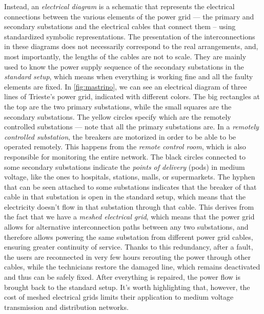 Instead, an \emph{electrical diagram} is a schematic that represents the electrical connections between the various elements of the power grid --- the primary and secondary substations and the electrical cables that connect them -- using standardized symbolic representations. The presentation of the interconnections in these diagrams does not necessarily correspond to the real arrangements, and, most importantly, the lengths of the cables are not to scale. They are mainly used to know the power supply sequence of the secondary substations in the \emph{standard setup}, which means when everything is working fine and all the faulty elements are fixed. In \autoref{fig:mastrino}, we can see an electrical diagram of three lines of Trieste's power grid, indicated with different colors. The big rectangles at the top are the two primary substations, while the small squares are the secondary substations. The yellow circles specify which are the remotely controlled substations --- note that all the primary substations are. In a \emph{remotely controlled substation}, the breakers are motorized in order to be able to be operated remotely. This happens from the \emph{remote control room}, which is also responsible for monitoring the entire network. The black circles connected to some secondary substations indicate the \emph{points of delivery} (pods) in medium voltage, like the ones to hospitals, stations, malls, or supermarkets. The hyphen that can be seen attached to some substations indicates that the breaker of that cable in that substation is open in the standard setup, which means that the electricity doesn't flow in that substation through that cable. This derives from the fact that we have a \emph{meshed electrical grid}, which means that the power grid allows for alternative interconnection paths between any two substations, and therefore allows powering the same substation from different power grid cables, ensuring greater continuity of service. Thanks to this redundancy, after a fault, the users are reconnected in very few hours rerouting the power through other cables, while the technicians restore the damaged line, which remains deactivated and thus can be safely fixed. After everything is repaired, the power flow is brought back to the standard setup. It's worth highlighting that, however, the cost of meshed electrical grids limits their application to medium voltage transmission and distribution networks.


